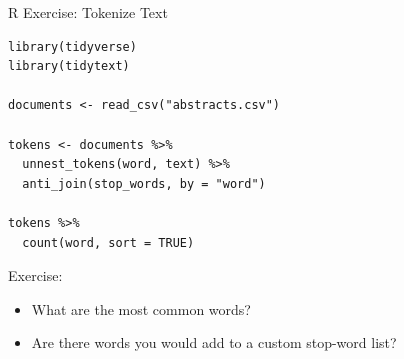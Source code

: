 \documentclass[aspectratio=169]{beamer}
\begin{document}
\begin{frame}[fragile]{R Exercise: Tokenize Text}
\begin{lstlisting}[style=Rstyle]
library(tidyverse)
library(tidytext)

documents <- read_csv("abstracts.csv")

tokens <- documents %>%
  unnest_tokens(word, text) %>%
  anti_join(stop_words, by = "word")

tokens %>%
  count(word, sort = TRUE)
  \end{lstlisting}

\vspace{0.2cm}
Exercise:
\begin{itemize}
  \item What are the most common words?
  \item Are there words you would add to a custom stop-word list?
\end{itemize}
\end{frame}
\end{document}
